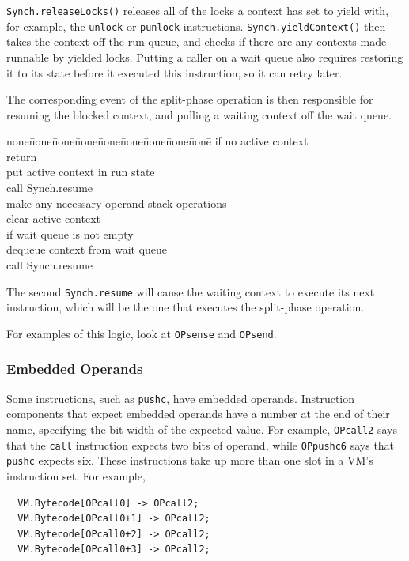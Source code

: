 \documentclass[10pt]{article}
\begin{document}
{\tt Synch.releaseLocks()} releases all of the locks a context has set
to yield with, for example, the {\tt unlock} or {\tt punlock}
instructions. {\tt Synch.yieldContext()} then takes the context off
the run queue, and checks if there are any contexts made runnable by
yielded locks. Putting a caller on a wait queue also requires
restoring it to its state before it executed this instruction, so it
can retry later.

The corresponding event of the split-phase operation is then
responsible for resuming the blocked context, and pulling a waiting
context off the wait queue.

\begin{tabbing}
none\=none\=none\=none\=none\=none\=none\=none\=none\= \kill
if no active context\\
\>return\\
put active context in run state\\
call Synch.resume\\
make any necessary operand stack operations\\
clear active context \\
if wait queue is not empty\\
\>dequeue context from wait queue\\
\>call Synch.resume\\
\end{tabbing}

The second {\tt Synch.resume} will cause the waiting context to
execute its next instruction, which will be the one that executes the
split-phase operation.

For examples of this logic, look at {\tt OPsense} and {\tt OPsend}.

\subsubsection{Embedded Operands}

Some instructions, such as {\tt pushc}, have embedded
operands. Instruction components that expect embedded operands have a
number at the end of their name, specifying the bit width of the
expected value. For example, {\tt OPcall2} says that the {\tt call}
instruction expects two bits of operand, while {\tt OPpushc6} says
that {\tt pushc} expects six. These instructions take up more than one
slot in a VM's instruction set. For example,

\begin{verbatim}
  VM.Bytecode[OPcall0] -> OPcall2;
  VM.Bytecode[OPcall0+1] -> OPcall2;
  VM.Bytecode[OPcall0+2] -> OPcall2;
  VM.Bytecode[OPcall0+3] -> OPcall2;
\end{verbatim}
\end{document}
